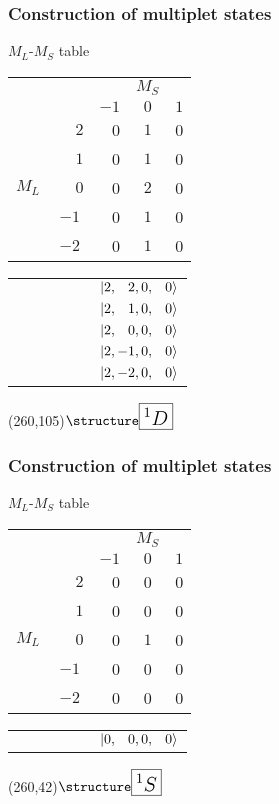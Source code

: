 \begin{frame}[t]
  \frametitle{Construction of multiplet states}
  \footnotesize
  $M_L$-$M_S$ table
  \begin{center}
  \begin{tabular}{c c|r c c}
        &  &  & $M_S$ & \\
        &  & $-1$ & $0$ & $1$ \\ \hline
        & $\phantom{-}2$ & 0 & $\boxed{1}$ & 0 \\
        & $\phantom{-}1$ & 0 & $\boxed{1}$ & 0 \\
  $M_L$ & $\phantom{-}0$ & 0 & $\boxed{2}$ & 0 \\
        & $-1$ & 0 & $\boxed{1}$ & 0 \\
        & $-2$ & 0 & $\boxed{1}$ & 0 \\
  \end{tabular}
  \end{center}
  \begin{center}
  \begin{tabular}{r}
  $\qquad\qquad\qquad\Ket{2,\phantom{-}2,0,\phantom{-}0}$ \\
  $\qquad\qquad\qquad\Ket{2,\phantom{-}1,0,\phantom{-}0}$ \\
  $\qquad\qquad\qquad\Ket{2,\phantom{-}0,0,\phantom{-}0}$ \\
  $\qquad\qquad\qquad\Ket{2,-1,0,\phantom{-}0}$ \\
  $\qquad\qquad\qquad\Ket{2,-2,0,\phantom{-}0}$ \\
  \end{tabular}
  \end{center}

  \Put(260,105){$\emph{\Large \boxed{{^1D}}}$}
\end{frame}

\begin{frame}[t]
  \frametitle{Construction of multiplet states}
  \footnotesize
  $M_L$-$M_S$ table
  \begin{center}
  \begin{tabular}{c c|r c c}
        &  &  & $M_S$ & \\
        &  & $-1$ & $0$ & $1$ \\ \hline
        & $\phantom{-}2$ & 0 & 0 & 0 \\
        & $\phantom{-}1$ & 0 & 0 & 0 \\
  $M_L$ & $\phantom{-}0$ & 0 & $\boxed{1}$ & 0 \\
        & $-1$ & 0 & 0 & 0 \\
        & $-2$ & 0 & 0 & 0 \\
  \end{tabular}
  \end{center}
  
  \vspace{-0.5em}
  \begin{center}
  \begin{tabular}{r}
  $\qquad\qquad\qquad\Ket{0,\phantom{-}0,0,\phantom{-}0}$ \\
  \end{tabular}
  \end{center}
  
  \Put(260,42){$\emph{\Large \boxed{{^1S}}}$}
\end{frame}

